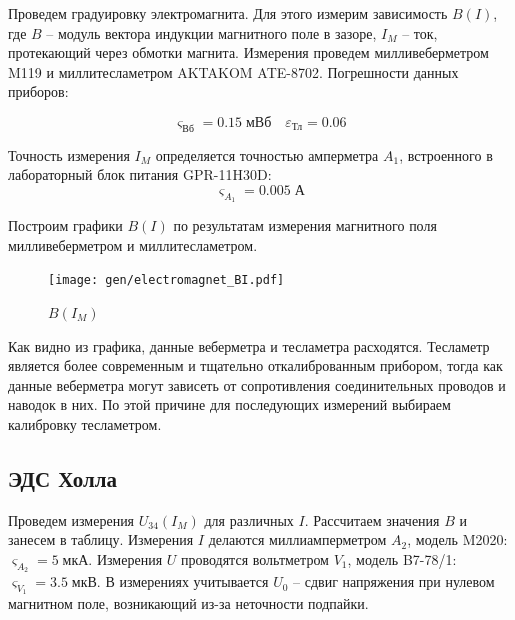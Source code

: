 \documentclass[12pt,a4paper]{article}
\begin{document}
	Проведем градуировку электромагнита. Для этого измерим зависимость $B(I)$, где $B$ -- модуль вектора индукции магнитного поле в зазоре, $I_M$ -- ток, протекающий через обмотки магнита. Измерения проведем милливеберметром M119 и миллитесламетром AKTAKOM ATE-8702. Погрешности данных приборов:
	
	$$ \varsigma_{\text{Вб}} = 0.15 \; \text{мВб} \quad \varepsilon_{\text{Тл}} = 0.06 $$
	
	Точность измерения $I_M$ определяется точностью амперметра $A_1$, встроенного в лабораторный блок питания GPR-11H30D: $$\varsigma_{A_1} = 0.005 \; \text{А}$$
	

	Построим графики $B(I)$ по результатам измерения магнитного поля милливеберметром и миллитесламетром.
	
	\begin{figure}[H]
		\texttt{[image: gen/electromagnet\_BI.pdf]}
		\caption{$B(I_M)$}
	\end{figure}

	Как видно из графика, данные веберметра и тесламетра расходятся. Тесламетр является более современным и тщательно откалиброванным прибором, тогда как данные веберметра могут зависеть от сопротивления соединительных проводов и наводок в них. По этой причине для последующих измерений выбираем калибровку тесламетром.
	
	\subsection*{ЭДС Холла}

	Проведем измерения $U_{34}(I_M)$ для различных $I$. Рассчитаем значения $B$ и занесем в таблицу.
	Измерения $I$ делаются миллиамперметром $A_2$, модель M2020: $\varsigma_{A_2} = 5 \; \text{мкА} $.
	Измерения $U$ проводятся вольтметром $V_1$, модель B7-78/1: $\varsigma_{V_1} = 3.5 \; \text{мкВ}$.
	В измерениях учитывается $U_0$ -- сдвиг напряжения при нулевом магнитном поле, возникающий из-за неточности подпайки.
	
	
		
\end{document}
